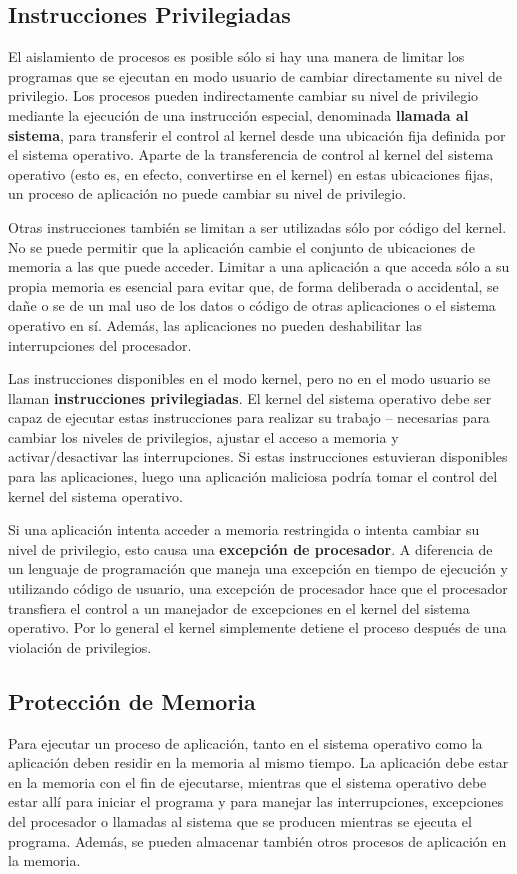 \documentclass[10pt]{book}
\begin{document}
\subsection{Instrucciones Privilegiadas}
El aislamiento de procesos es posible sólo si hay una manera de limitar los programas que se ejecutan en modo usuario de cambiar directamente su nivel de privilegio. Los procesos pueden indirectamente cambiar su nivel de privilegio mediante la ejecución de una instrucción especial, denominada \textbf{llamada al sistema}, para transferir el control al kernel desde una ubicación fija definida por el sistema operativo. Aparte de la transferencia de control al kernel del sistema operativo (esto es, en efecto, convertirse en el kernel) en estas ubicaciones fijas, un proceso de aplicación no puede cambiar su nivel de privilegio.

Otras instrucciones también se limitan a ser utilizadas sólo por código del kernel. No se puede permitir que la aplicación cambie el conjunto de ubicaciones de memoria a las que puede acceder. Limitar a una aplicación a que acceda sólo a su propia memoria es esencial para evitar que, de forma deliberada o accidental, se dañe o se de un mal uso de los datos o código de otras aplicaciones o el sistema operativo en sí. Además, las aplicaciones no pueden deshabilitar las interrupciones del procesador.

Las instrucciones disponibles en el modo kernel, pero no en el modo usuario se llaman \textbf{instrucciones privilegiadas}. El kernel del sistema operativo debe ser capaz de ejecutar estas instrucciones para realizar su trabajo -- necesarias para cambiar los niveles de privilegios, ajustar el acceso a memoria y activar/desactivar las interrupciones. Si estas instrucciones estuvieran disponibles para las aplicaciones, luego una aplicación maliciosa podría tomar el control del kernel del sistema operativo.

Si una aplicación intenta acceder a memoria restringida o intenta cambiar su nivel de privilegio, esto causa una \textbf{excepción de procesador}. A diferencia de un lenguaje de programación que maneja una excepción en tiempo de ejecución y utilizando código de usuario, una excepción de procesador hace que el procesador transfiera el control a un manejador de excepciones en el kernel del sistema operativo. Por lo general el kernel simplemente detiene el proceso después de una violación de privilegios.


\subsection{Protección de Memoria}
Para ejecutar un proceso de aplicación, tanto en el sistema operativo como la aplicación deben residir en la memoria al mismo tiempo. La aplicación debe estar en la memoria con el fin de ejecutarse, mientras que el sistema operativo debe estar allí para iniciar el programa y para manejar las interrupciones, excepciones del procesador o llamadas al sistema que se producen mientras se ejecuta el programa. Además, se pueden almacenar también otros procesos de aplicación en la memoria.
\end{document}

